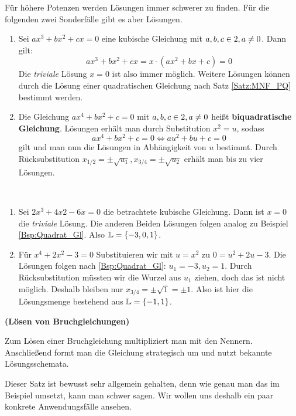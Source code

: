 \documentclass[ngerman, 12pt]{nssheetxea}
\begin{document}
Für höhere Potenzen werden Lösungen immer schwerer zu finden. Für die folgenden zwei Sonderfälle gibt es aber Lösungen. 
\begin{theorem}
\begin{enumerate}
\item Sei $ax^3+bx^2+cx=0$ eine kubische Gleichung mit $a,b,c \in 2, a\neq 0$. Dann gilt:
\[ ax^3+bx^2+cx = x \cdot (ax^2+bx+c) = 0  \]
Die \emph{triviale} Lösung $x=0$ ist also immer möglich. Weitere Lösungen können durch die Lösung einer quadratischen Gleichung nach Satz \ref{Satz:MNF_PQ} bestimmt werden. 
\item Die Gleichung $ax^4+bx^2+c=0$ mit $a,b,c\in 2, a\neq 0$ heißt \textbf{biquadratische Gleichung}. Lösungen erhält man durch Substitution $x^2=u$, sodass 
\[ ax^4+bx^2+c= 0 \Leftrightarrow au^2+bu+c = 0\]
gilt und man nun die Lösungen in Abhängigkeit von $u$ bestimmt. Durch Rücksubstitution $x_{1/2}=\pm\sqrt{u_1}, x_{3/4}=\pm \sqrt{u_2}$ erhält man bis zu vier Lösungen.
\end{enumerate}
 
\end{theorem}

\begin{example} \
\begin{enumerate}
\item Sei $2x^3+4x2-6x=0$ die betrachtete kubische Gleichung. Dann ist $x=0$ die \emph{triviale} Lösung. Die anderen Beiden Lösungen folgen analog zu Beispiel \ref{Bsp:Quadrat_Gl}. Also $\mathbb{L} = \{ -3, 0, 1\}$.
\item Für $x^4+2x^2-3=0$ Substituieren wir mit $u=x^2$ zu $0=u^2+2u-3$. Die Lösungen folgen nach \ref{Bsp:Quadrat_Gl}: $u_1=-3, u_2 = 1$. Durch Rücksubstitution müssten wir die Wurzel aus $u_1$ ziehen, doch das ist nicht möglich. Deshalb bleiben nur $x_{3/4}=\pm \sqrt{1} = \pm 1$. Also ist hier die Lösungsmenge bestehend aus $\mathbb{L} = \{ -1, 1\}$. 
\end{enumerate}
\end{example}

\begin{theorem} \textbf{(Lösen von Bruchgleichungen)} \par
Zum Lösen einer Bruchgleichung multipliziert man mit den Nennern. Anschließend formt man die Gleichung strategisch um und nutzt bekannte Lösungsschemata.
\index{Bruchgleichung}
\end{theorem}
Dieser Satz ist bewusst sehr allgemein gehalten, denn wie genau man das im Beispiel umsetzt, kann man schwer sagen. Wir wollen uns deshalb ein paar konkrete Anwendungsfälle ansehen.
\end{document}
